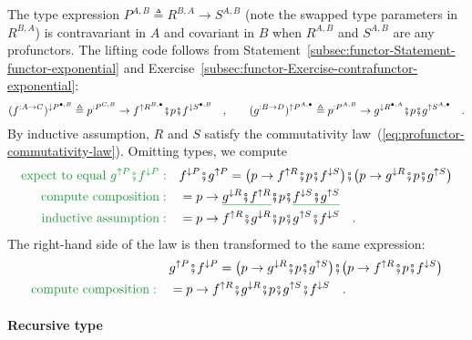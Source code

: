The type expression $P^{A,B}\triangleq R^{B,A}\rightarrow S^{A,B}$
(note the swapped type parameters in $R^{B,A}$) is contravariant
in $A$ and covariant in $B$ when $R^{A,B}$ and $S^{A,B}$ are any
profunctors. The lifting code follows from Statement~\ref{subsec:functor-Statement-functor-exponential}
and Exercise~\ref{subsec:functor-Exercise-contrafunctor-exponential}:
\[
(f^{:A\rightarrow C})^{\downarrow P^{\bullet,B}}\triangleq p^{:P^{C,B}}\rightarrow f^{\uparrow R^{B,\bullet}}\bef p\bef f^{\downarrow S^{\bullet,B}}\quad,\quad\quad(g^{:B\rightarrow D})^{\uparrow P^{A,\bullet}}\triangleq p^{:P^{A,B}}\rightarrow g^{\downarrow R^{\bullet,A}}\bef p\bef g^{\uparrow S^{A,\bullet}}\quad.
\]
By inductive assumption, $R$ and $S$ satisfy the commutativity law~(\ref{eq:profunctor-commutativity-law}).
Omitting types, we compute
\begin{align*}
{\color{greenunder}\text{expect to equal }g^{\uparrow P}\bef f^{\downarrow P}:}\quad & f^{\downarrow P}\bef g^{\uparrow P}=\big(p\rightarrow f^{\uparrow R}\bef p\bef f^{\downarrow S}\big)\bef\big(p\rightarrow g^{\downarrow R}\bef p\bef g^{\uparrow S}\big)\\
{\color{greenunder}\text{compute composition}:}\quad & =p\rightarrow\gunderline{g^{\downarrow R}\bef f^{\uparrow R}}\bef p\bef\gunderline{f^{\downarrow S}\bef g^{\uparrow S}}\\
{\color{greenunder}\text{inductive assumption}:}\quad & =p\rightarrow f^{\uparrow R}\bef g^{\downarrow R}\bef p\bef g^{\uparrow S}\bef f^{\downarrow S}\quad.
\end{align*}
The right-hand side of the law is then transformed to the same expression:
\begin{align*}
 & g^{\uparrow P}\bef f^{\downarrow P}=\big(p\rightarrow g^{\downarrow R}\bef p\bef g^{\uparrow S}\big)\bef\big(p\rightarrow f^{\uparrow R}\bef p\bef f^{\downarrow S}\big)\\
{\color{greenunder}\text{compute composition}:}\quad & =p\rightarrow f^{\uparrow R}\bef g^{\downarrow R}\bef p\bef g^{\uparrow S}\bef f^{\downarrow S}\quad.
\end{align*}


\paragraph{Recursive type}

